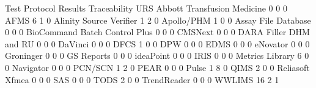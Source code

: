 \documentclass{article}
\begin{document}
\begin{Schunk}
\begin{Soutput}
                                Test Protocol Results Traceability URS
  Abbott Transfusion Medicine                       0            0   0
  AFMS                                              6            1   0
  Alinity Source Verifier                           1            2   0
  Apollo/PHM                                        1            0   0
  Assay File Database                               0            0   0
  BioCommand Batch Control Plus                     0            0   0
  CMSNext                                           0            0   0
  DARA Filler DHM and RU                            0            0   0
  DaVinci                                           0            0   0
  DFCS                                              1            0   0
  DPW                                               0            0   0
  EDMS                                              0            0   0
  eNovator                                          0            0   0
  Groninger                                         0            0   0
  GS Reports                                        0            0   0
  ideaPoint                                         0            0   0
  IRIS                                              0            0   0
  Metrics Library                                   6            0   0
  Navigator                                         0            0   0
  PCN/SCN                                           1            2   0
  PEAR                                              0            0   0
  Pulse                                             1            8   0
  QIMS                                              2            0   0
  Reliasoft Xfmea                                   0            0   0
  SAS                                               0            0   0
  TODS                                              2            0   0
  TrendReader                                       0            0   0
  WWLIMS                                           16            2   1
                               

\end{Soutput}
\end{Schunk}
\end{document}

